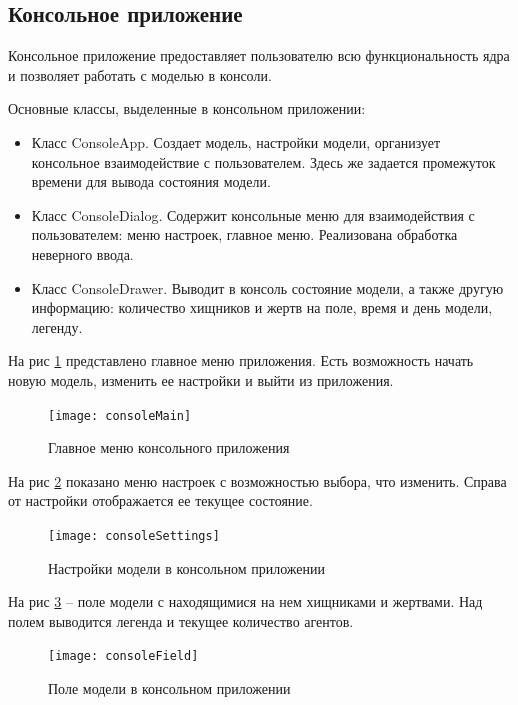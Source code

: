 \documentclass[a4paper]{article}
\begin{document}
\subsection{Консольное приложение}
Консольное приложение предоставляет пользователю всю функциональность ядра и позволяет работать с моделью в консоли. 

\noindent Основные классы, выделенные в консольном приложении:
\begin{itemize}
\item Класс ConsoleApp. Создает модель, настройки модели, организует консольное взаимодействие с пользователем. Здесь же задается промежуток времени для вывода состояния модели.
\item Класс ConsoleDialog. Содержит консольные меню для взаимодействия с пользователем: меню настроек, главное меню. Реализована обработка неверного ввода. 
\item Класс ConsoleDrawer. Выводит в консоль состояние модели, а также другую информацию: количество хищников и жертв на поле, время и день модели, легенду. 
\end{itemize}

На рис \ref{pic:consoleMain} представлено главное меню приложения. Есть возможность начать новую модель, изменить ее настройки и выйти из приложения. 

\begin{figure}[H]
	\begin{center}
		\texttt{[image: consoleMain]}
		\caption{Главное меню консольного приложения} 
		\label{pic:consoleMain} %
	\end{center}
\end{figure}

На рис \ref{pic:consoleSettings} показано меню настроек с возможностью выбора, что изменить. Справа от настройки отображается ее текущее состояние.

\begin{figure}[H]
	\begin{center}
		\texttt{[image: consoleSettings]}
		\caption{Настройки модели в консольном приложении} 
		\label{pic:consoleSettings} %
	\end{center}
\end{figure}

На рис \ref{pic:consoleField} – поле модели с находящимися на нем хищниками и жертвами. Над полем выводится легенда и текущее количество агентов. 

\begin{figure}[H]
	\begin{center}
		\texttt{[image: consoleField]}
		\caption{Поле модели в консольном приложении} 
		\label{pic:consoleField} %
	\end{center}
\end{figure}
\end{document}
